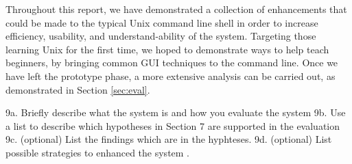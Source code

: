Throughout this report, we have demonstrated a collection of enhancements that
could be made to the typical Unix command line shell in order to increase
efficiency, usability, and understand-ability of the system. Targeting those
learning Unix for the first time, we hoped to demonstrate ways to help teach
beginners, by bringing common GUI techniques to the command line. Once we have
left the prototype phase, a more extensive analysis can be carried out, as
demonstrated in Section \ref{sec:eval}.


9a. Briefly describe what the system is and how you evaluate the system
9b. Use a list to describe which hypotheses in Section 7 are supported in the evaluation
9c. (optional) List the findings which are in the hyphteses.
9d. (optional) List possible strategies to enhanced the system
.
